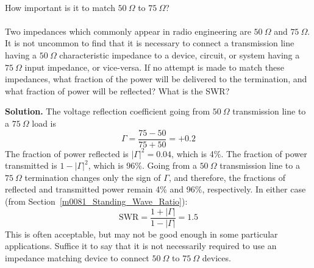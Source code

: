 ~\\ \begin{example} 
\begin{mdframed}[backgroundcolor=brown!20,linecolor=brown!20]\raggedright
How important is it to match $50~\Omega$ to $75~\Omega$?
\\~\\
Two impedances which commonly appear in radio engineering are $50~\Omega$ and $75~\Omega$.  
It is not uncommon to find that it is necessary to connect a transmission line having a $50~\Omega$ characteristic impedance to a device, circuit, or system having a $75~\Omega$ input impedance, or vice-versa.  If no attempt is made to match these impedances, what fraction of the power will be delivered to the termination, and what fraction of power will be reflected?  What is the SWR?

{\bf Solution.} The voltage reflection coefficient going from $50~\Omega$ transmission line to a $75~\Omega$ load is
%
\begin{equation}
\Gamma = \frac{75-50}{75+50} = +0.2
\nonumber
\end{equation}
%
The fraction of power reflected is $\left|\Gamma\right|^2 = 0.04$, which is 4\%.
The fraction of power transmitted is $1-\left|\Gamma\right|^2$, which is 96\%. 
Going from a $50~\Omega$ transmission line to a $75~\Omega$ termination changes only the sign of $\Gamma$, and therefore, the fractions of reflected and transmitted power remain 4\% and 96\%, respectively.
In either case (from Section~\ref{m0081_Standing_Wave_Ratio}):
%
\begin{equation}
\mbox{SWR} = \frac{1+\left|\Gamma\right|}{1-\left|\Gamma\right|} = 1.5
\nonumber
\end{equation}
%
This is often acceptable, but may not be good enough in some particular applications.
Suffice it to say that it is not necessarily required to use an impedance matching device to connect $50~\Omega$ to $75~\Omega$ devices.
\end{mdframed}\end{example}

